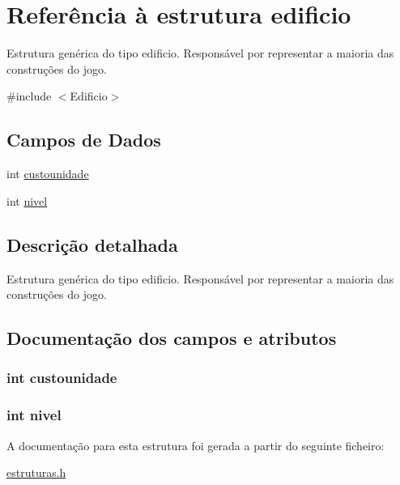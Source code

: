 \hypertarget{structedificio}{\section{\-Referência à estrutura edificio}
\label{structedificio}
}


\-Estrutura genérica do tipo edificio. \-Responsável por representar a maioria das construções do jogo.  




{\ttfamily \#include $<$\-Edificio$>$}

\subsection*{\-Campos de \-Dados}
\begin{DoxyCompactItemize}
\item 
int \hyperlink{structedificio_aafb05a9adafaeced482a85eb7e2894ee}{custounidade}
\item 
int \hyperlink{structedificio_afafcd32854d6f6b1c4cd3cca8f1315a7}{nivel}
\end{DoxyCompactItemize}


\subsection{\-Descrição detalhada}
\-Estrutura genérica do tipo edificio. \-Responsável por representar a maioria das construções do jogo. 

\subsection{\-Documentação dos campos e atributos}
\hypertarget{structedificio_aafb05a9adafaeced482a85eb7e2894ee}{
\subsubsection[{custounidade}]{\setlength{\rightskip}{0pt plus 5cm}int {\bf custounidade}}}\label{structedificio_aafb05a9adafaeced482a85eb7e2894ee}
\hypertarget{structedificio_afafcd32854d6f6b1c4cd3cca8f1315a7}{
\subsubsection[{nivel}]{\setlength{\rightskip}{0pt plus 5cm}int {\bf nivel}}}\label{structedificio_afafcd32854d6f6b1c4cd3cca8f1315a7}


\-A documentação para esta estrutura foi gerada a partir do seguinte ficheiro\-:\begin{DoxyCompactItemize}
\item 
\hyperlink{estruturas_8h}{estruturas.\-h}\end{DoxyCompactItemize}
